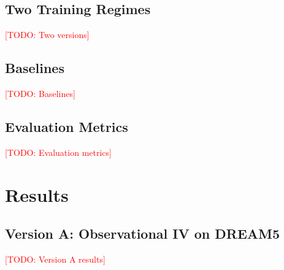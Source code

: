 \documentclass[11pt]{article}
\newcommand{\todo}[1]{\textcolor{red}{[TODO: #1]}}
\begin{document}
\subsection{Two Training Regimes}
%
%
\todo{Two versions}

\subsection{Baselines}
\todo{Baselines}

\subsection{Evaluation Metrics}
%
%
%
\todo{Evaluation metrics}

\section{Results}

\subsection{Version A: Observational IV on DREAM5}
\todo{Version A results}
\end{document}
